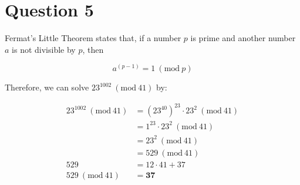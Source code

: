 \documentclass[11pt]{article}
\newcommand{\PMod}[1]{\ (\mathrm{mod}\ #1)}
\begin{document}
\section*{Question 5}
Fermat's Little Theorem states that, if a number $p$ is prime and another number $a$ is not divisible by $p$, then

\[a^{(p-1)} = 1 \PMod{p}\]

Therefore, we can solve $23^{1002} \PMod{41}$ by:

\begin{align*}
    23^{1002} \PMod{41} &= (23^{40})^{23} \cdot 23^2 \PMod{41}\\
    &= 1^{23} \cdot 23^2 \PMod{41}\\
    &= 23^2 \PMod{41}\\
    &= 529 \PMod{41}\\
    529 &= 12 \cdot 41 + 37\\
    529 \PMod{41} &= \boxed{\mathbf{37}}
\end{align*}
\end{document}
